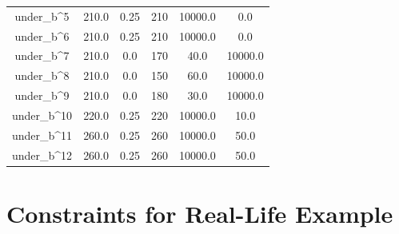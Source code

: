 \documentclass[a4paper,11pt]{article}
\begin{document}
\begin{longtable}{cccccc}
under\_b\textasciicircum{}5 & 210.0 & 0.25 & 210 & 10000.0 & 0.0\\
under\_b\textasciicircum{}6 & 210.0 & 0.25 & 210 & 10000.0 & 0.0\\
\addlinespace
under\_b\textasciicircum{}7 & 210.0 & 0.0 & 170 & 40.0 & 10000.0\\
under\_b\textasciicircum{}8 & 210.0 & 0.0 & 150 & 60.0 & 10000.0\\
under\_b\textasciicircum{}9 & 210.0 & 0.0 & 180 & 30.0 & 10000.0\\
under\_b\textasciicircum{}10 & 220.0 & 0.25 & 220 & 10000.0 & 10.0\\
under\_b\textasciicircum{}11 & 260.0 & 0.25 & 260 & 10000.0 & 50.0\\
\addlinespace
under\_b\textasciicircum{}12 & 260.0 & 0.25 & 260 & 10000.0 & 50.0\\*
\end{longtable}
\endgroup{}

\section{Constraints for Real-Life Example} \label{se:con}

\begin{table}[H]
\centering
\caption{Constraints for real-life case}
\end{table}
\end{document}
